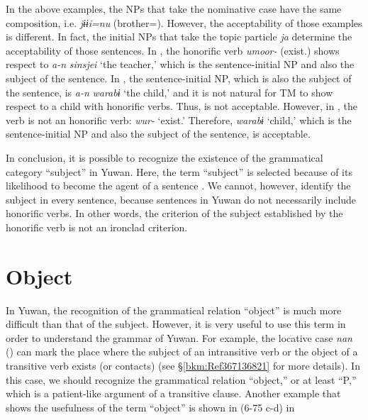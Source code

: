 In the above examples, the NPs that take the nominative case have the same composition, i.e. \textit{jɨɨi=nu} (brother=\NOM). However, the acceptability of those examples is different. In fact, the initial NPs that take the topic particle \textit{ja} determine the acceptability of those sentences. In , the honorific verb \textit{umoor-} (exist.\HON) shows respect to \textit{a-n} \textit{sinsjei} ‘the teacher,’ which is the sentence-initial NP and also the subject of the sentence. In , the sentence-initial NP, which is also the subject of the sentence, is \textit{a-n} \textit{warabɨ} ‘the child,’ and it is not natural for TM to show respect to a child with honorific verbs. Thus,  is not acceptable. However, in , the verb is not an honorific verb: \textit{wur-} ‘exist.’ Therefore, \textit{warabɨ} ‘child,’ which is the sentence-initial NP and also the subject of the sentence, is acceptable.

In conclusion, it is possible to recognize the existence of the grammatical category “subject” in Yuwan. Here, the term “subject” is selected because of its likelihood to become the agent of a sentence \citep[cf.][136]{Andrews2007}. We cannot, however, identify the subject in every sentence, because sentences in Yuwan do not necessarily include honorific verbs. In other words, the criterion of the subject established by the honorific verb is not an ironclad criterion.

\section{Object}
\label{bkm:Ref350115710}\hypertarget{RefHeadingToc395696989}{}
In Yuwan, the recognition of the grammatical relation “object” is much more difficult than that of the subject. However, it is very useful to use this term in order to understand the grammar of Yuwan. For example, the locative case \textit{nan} (\LOCOne) can mark the place where the subject of an intransitive verb or the object of a transitive verb exists (or contacts) (see §\ref{bkm:Ref367136821} for more details). In this case, we should recognize the grammatical relation “object,” or at least “P,” which is a patient-like argument of a transitive clause. Another example that shows the usefulness of the term “object” is shown in (6-75 c-d) in 
